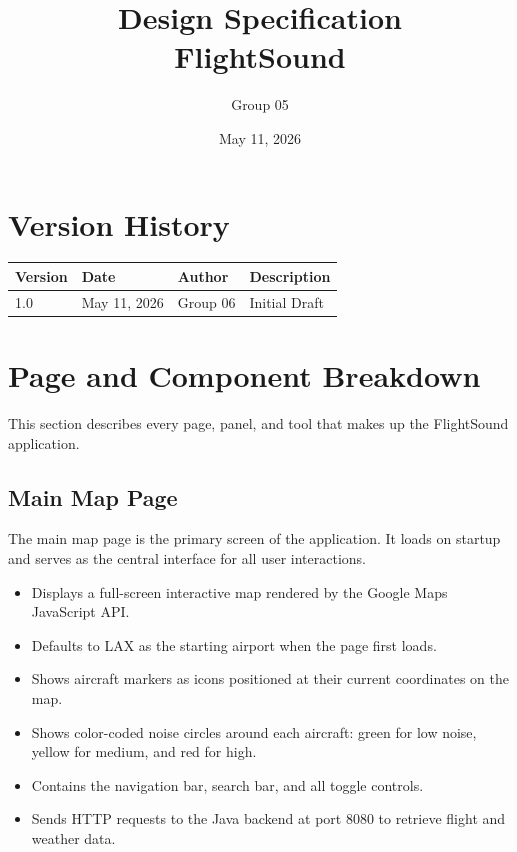 \documentclass[12pt]{article}
\title{Design Specification\\FlightSound}
\author{Group 05}
\date{May 11, 2026}
\begin{document}
\maketitle
\newpage

\tableofcontents
\newpage

\section*{Version History}

\begin{tabular}{|l|l|l|l|}
\hline
Version & Date & Author & Description \\
\hline
1.0 & May 11, 2026 & Group 06 & Initial Draft \\
\hline
\end{tabular}

\newpage

\section{Page and Component Breakdown}

This section describes every page, panel, and tool that makes up the FlightSound application.

\subsection{Main Map Page}
The main map page is the primary screen of the application. It loads on startup and serves as the central interface for all user interactions.

\begin{itemize}
\item Displays a full-screen interactive map rendered by the Google Maps JavaScript API.
\item Defaults to LAX as the starting airport when the page first loads.
\item Shows aircraft markers as icons positioned at their current coordinates on the map.
\item Shows color-coded noise circles around each aircraft: green for low noise, yellow for medium, and red for high.
\item Contains the navigation bar, search bar, and all toggle controls.
\item Sends HTTP requests to the Java backend at port 8080 to retrieve flight and weather data.
\end{itemize}
\end{document}
